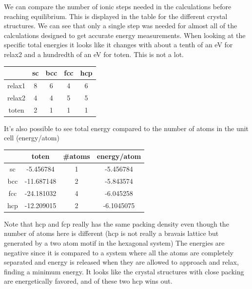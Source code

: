 \documentclass[a4paper,10pt]{article}
\begin{document}
  We can compare the number of ionic steps needed in the calculations before reaching equilibrium. This is displayed in the table for the different crystal structures. We can see that only a single step was needed for almost all of the calculations designed to get accurate energy measurements. When looking at the specific total energies it looks like it changes with about a tenth of an eV for relax2 and a hundredth of an eV for toten. This is not a lot. 
\begin{center}
	  \begin{tabular}{|c|c|c|c|c|}
  	\hline 
  	& sc & bcc & fcc & hcp \\ 
  	\hline 
  	relax1 & 8 & 6 & 4 & 6 \\ 
  	\hline 
  	relax2 & 4 & 4 & 5 & 5 \\ 
  	\hline 
  	toten & 2 & 1 & 1 & 1 \\ 
  	\hline 
  \end{tabular}
\end{center}
	It's also possible to see total energy compared to the number of atoms in the unit cell (energy/atom)
	\begin{center}
	\begin{tabular}{|c|c|c|c|}
		\hline 
		& toten & #atoms & energy/atom \\ 
		\hline 
		sc & -5.456784  & 1 & -5.456784  \\ 
		\hline 
		bcc & -11.687148 & 2 & -5.843574
		\\ 
		\hline 
		fcc & -24.181032  & 4 & -6.045258 \\ 
		\hline 
		hcp & -12.209015 & 2 & -6.1045075 \\ 
		\hline 
	\end{tabular} 
	\end{center}
	Note that hcp and fcp really has the same packing density even though the number of atoms here is different (hcp is not really a bravais lattice but generated by a two atom motif in the hexagonal system)
	The energies are negative since it is compared to a system where all the atoms are completely separated and energy is released when they are allowed to approach and relax, finding a minimum energy. It looks like the crystal structures with close packing are energetically favored, and of these two hcp wins out.\\
\end{document}
